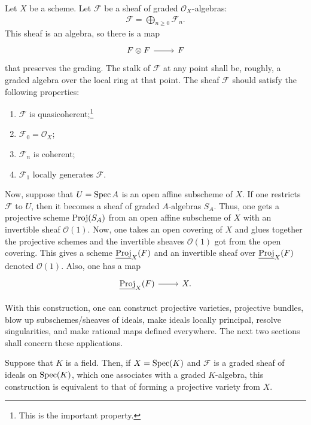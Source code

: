 \documentclass [11 pt, oneside] {article}
\begin{document}
Let $X$ be a scheme. Let $\mathscr{F}$ be a sheaf of graded $\mathscr{O}_X$-algebras:
\begin{align*}
	\mathscr{F} = \bigoplus_{n\ge 0}^{} \mathscr{F}_n.
\end{align*}
This sheaf is an algebra, so there is a map
\[
\begin{tikzcd}
	\mathscr{F}\tensor \mathscr{F}\ar[r]&\mathscr{F}
\end{tikzcd}
\]
that preserves the grading.
The stalk of $\mathscr{F}$ at any point shall be, roughly, a graded algebra over the local ring at that point. The sheaf $\mathscr{F}$ should satisfy the following properties:
\begin{enumerate}
	\item $\mathscr{F}$ is quasicoherent;\footnote{This is the important property.}
	\item $\mathscr{F}_0 = \mathscr{O}_X$;
	\item $\mathscr{F}_n$ is coherent;
	\item $\mathscr{F}_1$ locally generates $\mathscr{F}$.
\end{enumerate}

Now, suppose that $U=\operatorname{Spec} A$ is an open affine subscheme of $X$. If one restricts $\mathscr{F}$ to $U$, then it becomes a sheaf of graded $A$-algebras $S_A$. Thus, one gets a projective scheme $\operatorname{Proj} (S_A)$ from an open affine subscheme of $X$ with an invertible sheaf $\mathscr{O}(1)$. 
Now, one takes an open covering of $X$ and glues together the projective schemes and the invertible sheaves $\mathscr{O}(1)$ got from the open covering. This gives a scheme $\underline{\operatorname{Proj}}_X(\relax{F})$ and an invertible sheaf over $\underline{\operatorname{Proj}}_X(\relax{F})$ denoted $\mathscr{O}(1)$. Also, one has a map
\[
\begin{tikzcd}
	\underline{\Proj}_X(\mathscr{F}) \ar[r]& X.
\end{tikzcd}
\]

With this construction, one can construct projective varieties, projective bundles, blow up subschemes/sheaves of ideals, make ideals locally principal, resolve singularities, and make rational maps defined everywhere.
The next two sections shall concern these applications.

Suppose that $K$ is a field. Then, if $X=\operatorname{Spec} (K)$ and $\mathscr{F}$ is a graded sheaf of ideals on $\operatorname{Spec} (K)$, which one associates with a graded $K$-algebra, this construction is equivalent to that of forming a projective variety from $X$.
\end{document}
